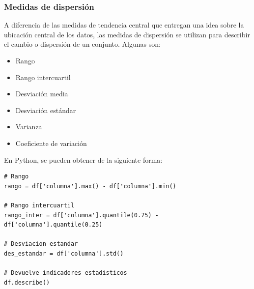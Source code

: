 \documentclass[a4paper, 12pt]{book}
\begin{document}
\subsubsection{Medidas de dispersión}
A diferencia de las medidas de tendencia central que entregan una idea sobre la ubicación central de los datos, las medidas de dispersión se utilizan para describir el cambio o dispersión de un conjunto. Algunas son:
\begin{itemize}
	\item Rango
	\item Rango intercuartil
	\item Desviación media
	\item Desviación estándar
	\item Varianza
	\item Coeficiente de variación
\end{itemize}
En Python, se pueden obtener de la siguiente forma:
\begin{verbatim}
# Rango
rango = df['columna'].max() - df['columna'].min()
	
# Rango intercuartil
rango_inter = df['columna'].quantile(0.75) - df['columna'].quantile(0.25)
	
# Desviacion estandar
des_estandar = df['columna'].std()
	
# Devuelve indicadores estadisticos
df.describe()
\end{verbatim}



\end{document}
